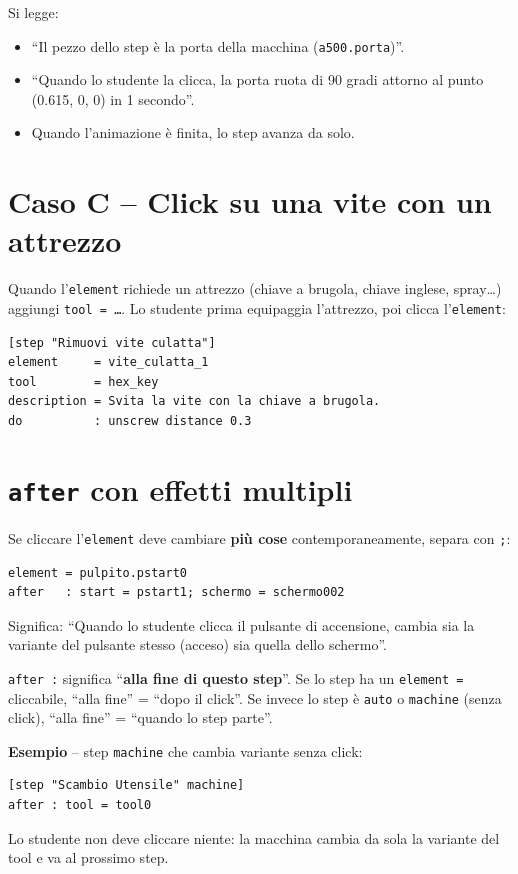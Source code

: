 ﻿\documentclass[a4paper,12pt,oneside]{book}
\newcommand{\kw}[1]{\texttt{\color{keycolor}#1}}
\newcommand{\val}[1]{\texttt{\color{cvtgreen}#1}}
\begin{document}
Si legge:

\begin{itemize}
  \item ``Il pezzo dello step è la porta della macchina (\texttt{a500.porta})''.
  \item ``Quando lo studente la clicca, la porta ruota di 90 gradi attorno al
        punto (0.615, 0, 0) in 1 secondo''.
  \item Quando l'animazione è finita, lo step avanza da solo.
\end{itemize}

\section{Caso C -- Click su una vite con un attrezzo}

Quando l'\kw{element} richiede un attrezzo (chiave a brugola, chiave inglese,
spray\ldots) aggiungi \kw{tool = \ldots}. Lo studente prima equipaggia
l'attrezzo, poi clicca l'\kw{element}:

\begin{lstlisting}
[step "Rimuovi vite culatta"]
element     = vite_culatta_1
tool        = hex_key
description = Svita la vite con la chiave a brugola.
do          : unscrew distance 0.3
\end{lstlisting}

\section{\texttt{after} con effetti multipli}

Se cliccare l'\kw{element} deve cambiare \textbf{più cose} contemporaneamente,
separa con \texttt{;}:

\begin{lstlisting}
element = pulpito.pstart0
after   : start = pstart1; schermo = schermo002
\end{lstlisting}

Significa: ``Quando lo studente clicca il pulsante di accensione, cambia sia la
variante del pulsante stesso (acceso) sia quella dello schermo''.

\begin{notablu}
\kw{after :} significa ``\textbf{alla fine di questo step}''. Se lo step ha un
\kw{element =} cliccabile, ``alla fine'' = ``dopo il click''. Se invece lo step
è \val{auto} o \val{machine} (senza click), ``alla fine'' = ``quando lo step
parte''.

\textbf{Esempio} -- step \val{machine} che cambia variante senza click:

\begin{lstlisting}
[step "Scambio Utensile" machine]
after : tool = tool0
\end{lstlisting}

Lo studente non deve cliccare niente: la macchina cambia da sola la variante
del tool e va al prossimo step.
\end{notablu}
\end{document}
